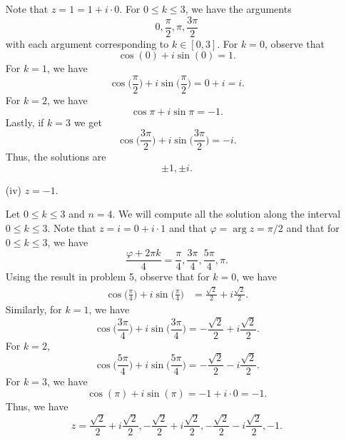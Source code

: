 \documentclass[a4paper]{article}
\begin{document}
\begin{enumerate}
\begin{solution}
                Note that \( z = 1 = 1 + i \cdot 0  \). For \( 0 \leq k \leq 3  \), we have the arguments
                \[  0 , \frac{ \pi }{ 2 },  \pi, \frac{ 3 \pi  }{  2  }   \]
                with each argument corresponding to \( k \in [0,3]  \). For \( k = 0  \), observe that 
                \[  \cos(0) + i \sin (0) = 1.  \]
                For \( k = 1  \), we have 
                \[ \cos \Big(  \frac{ \pi }{ 2 }  \Big) + i \sin \Big(  \frac{ \pi }{ 2 }  \Big) = 0 + i = i.   \]
                For \( k = 2  \), we have
                \[  \cos \pi + i \sin \pi = -1. \]
                Lastly, if \( k = 3  \) we get  
                \[ \cos \Big(  \frac{ 3 \pi  }{ 2 }  \Big) + i \sin \Big(  \frac{ 3 \pi }{ 2 }  \Big) = - i.   \] 
                Thus, the solutions are  
                \[  \pm 1, \pm i. \]



                \end{solution}
            \item[(iv)] \( z = -1  \).
                \begin{solution}
                Let \( 0 \leq k \leq 3   \) and \( n = 4  \). We will compute all the solution along the interval \( 0 \leq k \leq 3   \). Note that \( z = i = 0 + i \cdot 1 \) and that \( \varphi =  \arg z = \pi / 2  \) and that for \( 0 \leq k \leq 3 \), we have   
                \[  \frac{  \varphi + 2 \pi k   }{ 4   } = \frac{ \pi  }{ 4 }, \frac{ 3 \pi  }{ 4  },  \frac{  5 \pi  }{ 4 }, \pi.       \]
                Using the result in problem 5, observe that for \( k = 0  \), we have 
                \begin{align*}
                   \cos \Big(  \frac{  \pi  }{ 4  }   \Big)  + i \sin \Big(  \frac{ \pi  }{ 4  }  \Big) &= \frac{ \sqrt{ 2 }  }{ 2 }  + i \frac{ \sqrt{ 2 }  }{ 2 }.
                \end{align*}
                Similarly, for \( k = 1  \), we have 
                \[  \cos \Big(  \frac{ 3 \pi  }{ 4  }  \Big) + i \sin \Big(  \frac{ 3 \pi  }{  4  }  \Big) = - \frac{ \sqrt{ 2 }  }{ 2 }  + i \frac{ \sqrt{ 2 }  }{ 2 }. \]
                For \( k = 2  \), 
                \[  \cos \Big(  \frac{ 5 \pi  }{  4  }  \Big) + i \sin \Big(  \frac{ 5 \pi  }{  4  }  \Big) = - \frac{ \sqrt{ 2 }  }{ 2 }  - i \frac{ \sqrt{ 2 }  }{ 2 }. \]
                For \( k = 3  \), we have 
                \[  \cos (\pi)  + i \sin (\pi) = -1 + i \cdot 0 = -1. \]
                Thus, we have 
                \[  z = \frac{ \sqrt{ 2 }  }{ 2 }  + i \frac{ \sqrt{ 2 }  }{ 2 },  - \frac{ \sqrt{ 2 }  }{ 2 }  + i \frac{ \sqrt{ 2 }  }{ 2 }, - \frac{ \sqrt{ 2 }  }{ 2 }  - i \frac{ \sqrt{ 2 }  }{ 2 }, -1. \]

                \end{solution}
        \end{enumerate}
\end{document}
